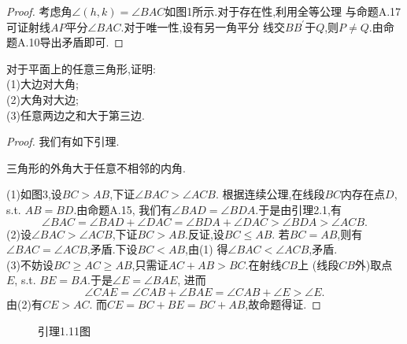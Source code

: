 \begin{proof}
    考虑角$\angle(h,k)=\angle BAC$如图1所示.对于存在性,利用全等公理
    与命题A.17可证射线$AP$平分$\angle BAC$.对于唯一性,设有另一角平分
    线交$BB^\prime$于$Q$,则$P\neq Q$.由命题A.10导出矛盾即可.
\end{proof}
\begin{exercise}
    对于平面上的任意三角形,证明:\\
    (1)大边对大角;\\
    (2)大角对大边;\\
    (3)任意两边之和大于第三边.
\end{exercise}
\begin{proof}
    我们有如下引理.
    \begin{lemma}[外角定理]
        三角形的外角大于任意不相邻的内角.
    \end{lemma}
    (1)如图3,设$BC>AB$,下证$\angle BAC>\angle ACB$.
    根据连续公理,在线段$BC$内存在点$D$, s.t. $AB=BD$.由命题A.15,
    我们有$\angle BAD=\angle BDA$.于是由引理2.1,有
    \[\angle BAC=\angle BAD+\angle DAC=\angle BDA+\angle DAC>
    \angle BDA>\angle ACB.\]
	(2)设$\angle BAC>\angle ACB$,下证$BC>AB$.反证,设$BC\leq AB$.
    若$BC=AB$,则有$\angle BAC=\angle ACB$,矛盾.下设$BC<AB$,由(1)
    得$\angle BAC<\angle ACB$,矛盾.\\
	(3)不妨设$BC\geq AC\geq AB$,只需证$AC+AB>BC$.在射线$CB$上
    (线段$CB$外)取点 $E$, s.t. $BE=BA$.于是$\angle E=\angle BAE$,
    进而\[\angle CAE=\angle CAB+\angle BAE=
    \angle CAB+\angle E>\angle E.\]由(2)有$CE>AC$.
    而$CE=BC+BE=BC+AB$,故命题得证.
\end{proof}
\begin{figure}
    \caption{引理1.11图}
\end{figure}

